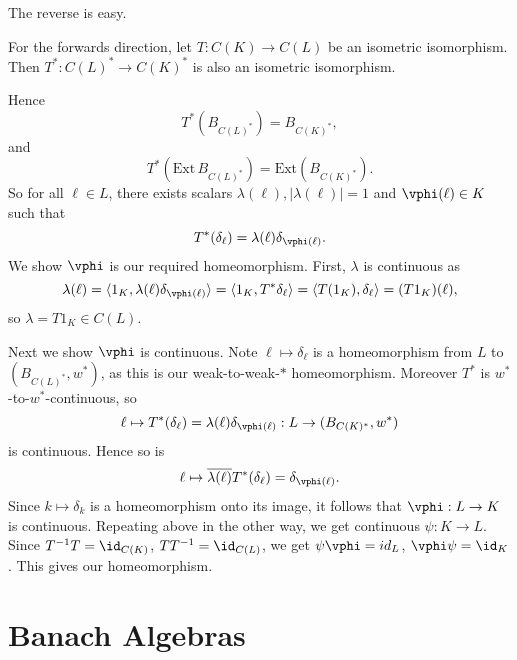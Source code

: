 \documentclass[12pt]{article}
\begin{document}
\begin{proofbox}
	The reverse is easy.

	For the forwards direction, let $T : C(K) \to C(L)$ be an isometric isomorphism. Then $T^{\ast} : C(L)^{\ast} \to C(K)^{\ast}$ is also an isometric isomorphism.

	Hence
	\[
		T^{\ast}(B_{C(L)^{\ast}}) = B_{C(K)^{\ast}},
	\]
	and
	\[
	T^{\ast}(\mathrm{Ext}\, B_{C(L)^{\ast}}) = \mathrm{Ext}(B_{C(K)^{\ast}}).
	\]
	So for all $\ell \in L$, there exists scalars $\lambda(\ell), |\lambda(\ell)| = 1$ and $\vphi(\ell) \in K$ such that
	\[
	T^{\ast}(\delta_{\ell}) = \lambda(\ell) \delta_{\vphi(\ell)}.
	\]
	We show $\vphi$ is our required homeomorphism. First, $\lambda$ is continuous as
	\[
	\lambda(\ell) = \langle 1_K, \lambda(\ell) \delta_{\vphi(\ell)} \rangle = \langle 1_K, T^{\ast} \delta_\ell\rangle = \langle T(1_K), \delta_\ell\rangle = (T 1_K)(\ell),
	\]
	so $\lambda = T 1_K \in C(L)$.

	Next we show $\vphi$ is continuous. Note $\ell \mapsto \delta_\ell$ is a homeomorphism from $L$ to $(B_{C(L)^{\ast}}, w^{\ast})$, as this is our weak-to-weak-$\ast$ homeomorphism. Moreover $T^{\ast}$ is $w^{\ast}$-to-$w^{\ast}$-continuous, so
	\[
	\ell \mapsto T^{\ast}(\delta_\ell) = \lambda(\ell) \delta_{\vphi(\ell)} : L \to (B_{C(K)^{\ast}}, w^{\ast})
	\]
	is continuous. Hence so is
	\[
	\ell \mapsto \overline{\lambda(\ell)} T^{\ast}(\delta_\ell) = \delta_{\vphi(\ell)}.
	\]
	Since $k \mapsto \delta_k$ is a homeomorphism onto its image, it follows that $\vphi : L \to K$ is continuous. Repeating above in the other way, we get continuous $\psi : K \to L$. Since $T^{-1} T = \id_{C(K)}$, $T T^{-1} = \id_{C(L)}$, we get $\psi \vphi = id_L$, $\vphi \psi = \id_K$. This gives our homeomorphism.
\end{proofbox}

\newpage

\section{Banach Algebras}%
\label{sec:bas}
\end{document}
